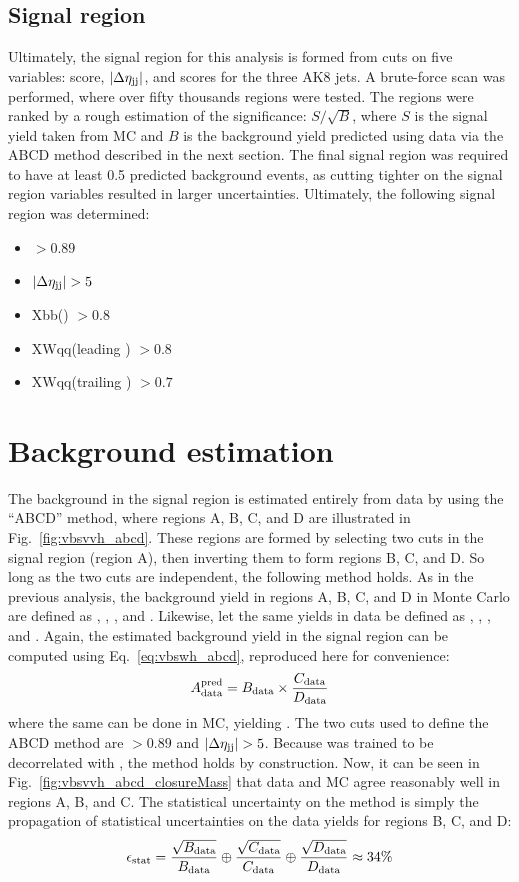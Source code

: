 \subsection{Signal region}
Ultimately, the signal region for this analysis is formed from cuts on five variables: \ABCDNet score, $|\Delta\eta_{\mathrm{j}\mathrm{j}}|$, and \ParticleNet scores for the three AK8 jets. 
A brute-force scan was performed, where over fifty thousands regions were tested. 
The regions were ranked by a rough estimation of the significance: $S/\sqrt{B}$, where $S$ is the signal yield taken from MC and $B$ is the background yield predicted using data via the ABCD method described in the next section.
The final signal region was required to have at least 0.5 predicted background events, as cutting tighter on the signal region variables resulted in larger uncertainties. 
Ultimately, the following signal region was determined:
\begin{itemize}
    \item \ABCDNet $> 0.89$
    \item $|\Delta\eta_{\mathrm{j}\mathrm{j}}| > 5$
    \item Xbb(\Htobb) $> 0.8$
    \item XWqq(leading \Vtoqq) $> 0.8$
    \item XWqq(trailing \Vtoqq) $> 0.7$
\end{itemize}

\section{Background estimation}
The background in the signal region is estimated entirely from data by using the ``ABCD'' method, where regions A, B, C, and D are illustrated in Fig.~\ref{fig:vbsvvh_abcd}. %
These regions are formed by selecting two cuts in the signal region (region A), then inverting them to form regions B, C, and D. 
So long as the two cuts are independent, the following method holds. 
As in the previous analysis, the background yield in regions A, B, C, and D in Monte Carlo are defined as \AMC, \BMC, \CMC, and \DMC.
Likewise, let the same yields in data be defined as  \Adata, \Bdata, \Cdata, and \Ddata.
Again, the estimated background yield in the signal region \AdataPred can be computed using Eq.~\ref{eq:vbswh_abcd}, reproduced here for convenience:
\begin{equation*}
    A_{\text{data}}^{\text{pred}} = B_{\text{data}}\times\frac{C_{\text{data}}}{D_{\text{data}}}
\end{equation*}
where the same can be done in MC, yielding \AMCPred. 
The two cuts used to define the ABCD method are \ABCDNet $> 0.89$ and $|\Delta\eta_{\mathrm{j}\mathrm{j}}| > 5$. 
Because \ABCDNet was trained to be decorrelated with \detajj, the method holds by construction. 
Now, it can be seen in Fig.~\ref{fig:vbsvvh_abcd_closureMass} that data and MC agree reasonably well in regions A, B, and C. 
The statistical uncertainty \Estat on the method is simply the propagation of statistical uncertainties on the data yields for regions B, C, and D:
\begin{equation}\label{eq:vbsvvh_statUnc}
    \epsilon_{\text{stat}} = \frac{\sqrt{B_{\text{data}}}}{B_{\text{data}}} \oplus \frac{\sqrt{C_{\text{data}}}}{C_{\text{data}}} \oplus \frac{\sqrt{D_{\text{data}}}}{D_{\text{data}}} \approx 34\% 
\end{equation}

